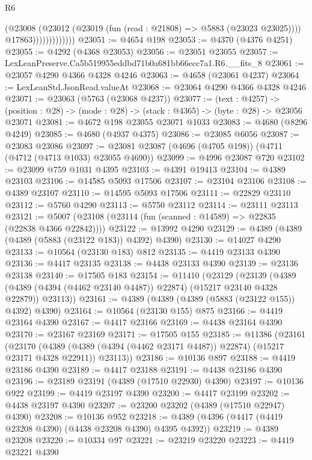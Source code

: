 \begin{lexlean}{R6}
\begin{coremodule}
                            (@23008
                              (@23012 (@23019 (fun (read : @21808) => @5883 (@23023 @23025))))
                              @17863)))))))))))))
@23051 := @4654 @198
@23053 := @4370 (@4376 @4251)
@23055 := @4292 (@4368 @23053)
@23056 := @23051 @23055
@23057 := LexLeanPreserve.Ca5b519955eddbd71b0a681bb66ecc7a1.R6.__fits_8
@23061 := @23057 @4290 @4366 @4328 @4246
@23063 := @4658 (@23061 @4237)
@23064 := LexLeanStd.JsonRead.valueAt
@23068 := @23064 @4290 @4366 @4328 @4246
@23071 := @23063 (@5763 (@23068 @4237))
@23077 := (text : @4257) ->
  (position : @28) -> (mode : @28) -> (stack : @4365) -> (byte : @28) -> @23056 @23071
@23081 := @4672 @198 @23055 @23071 @1033
@23083 := @4680 (@8296 @4249)
@23085 := @4680 (@4937 @4375)
@23086 := @23085 @6056
@23087 := @23083 @23086
@23097 := @23081 @23087 (@4696 (@4705 @198)) (@4711 (@4712 (@4713 @1033) @23055 @4690))
@23099 := @4996 @23087 @720
@23102 := @23099 @759 @1031 @4395
@23103 := @4391 @19413
@23104 := @4389 @23103
@23106 := @14585 @5093 @17506
@23107 := @23104 @23106
@23108 := @4389 @23107
@23110 := @14595 @5093 @17506
@23111 := @22829 @23110
@23112 := @5760 @4290
@23113 := @5750 @23112
@23114 := @23111 @23113
@23121 := @5007 (@23108 (@23114 (fun (scanned : @14589) => @22835 (@22838 @4366 @22842))))
@23122 := @13992 @4290
@23129 := @4389 (@4389 (@4389 (@5883 (@23122 @183)) @4392) @4390)
@23130 := @14027 @4290
@23133 := @10564 (@23130 @183) @812
@23135 := @4419 @23133 @4390
@23136 := @4417 @23135
@23138 := @4438 @23133 @4390
@23139 := @23136 @23138
@23140 := @17505 @183
@23154 := @11410
    (@23129
      (@23139
        (@4389 (@4389 (@4394 (@4462 @23140 @4487)) @22874) (@15217 @23140 @4328 @22879))
        @23113))
@23161 := @4389 (@4389 (@4389 (@5883 (@23122 @155)) @4392) @4390)
@23164 := @10564 (@23130 @155) @875
@23166 := @4419 @23164 @4390
@23167 := @4417 @23166
@23169 := @4438 @23164 @4390
@23170 := @23167 @23169
@23171 := @17505 @155
@23185 := @11386
    (@23161
      (@23170
        (@4389 (@4389 (@4394 (@4462 @23171 @4487)) @22874) (@15217 @23171 @4328 @22911))
        @23113))
@23186 := @10136 @897
@23188 := @4419 @23186 @4390
@23189 := @4417 @23188
@23191 := @4438 @23186 @4390
@23196 := @23189 @23191 (@4389 (@17510 @22930) @4390)
@23197 := @10136 @922
@23199 := @4419 @23197 @4390
@23200 := @4417 @23199
@23202 := @4438 @23197 @4390
@23207 := @23200 @23202 (@4389 (@17510 @22947) @4390)
@23208 := @10136 @952
@23218 := @4389 (@4396 (@4417 (@4419 @23208 @4390) (@4438 @23208 @4390) @4395 @4392))
@23219 := @4389 @23208
@23220 := @10334 @97
@23221 := @23219 @23220
@23223 := @4419 @23221 @4390

\end{coremodule}
\end{lexlean}
